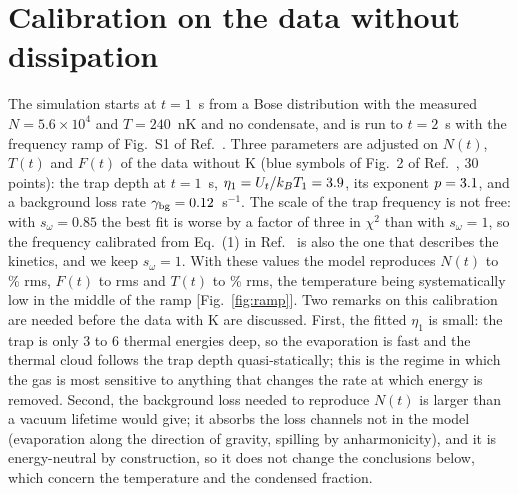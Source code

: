 \section{Calibration on the data without dissipation}
\label{sec:calib}
The simulation starts at $t=1$~s from a Bose distribution with the measured
$N=5.6\times10^4$ and $T=240$~nK and no condensate, and is run to $t=2$~s with
the frequency ramp of Fig.~S1 of Ref.~\cite{MelladoMunoz2020}. Three
parameters are adjusted on $N(t)$, $T(t)$ and $F(t)$ of the data without K
(blue symbols of Fig.~2 of Ref.~\cite{MelladoMunoz2020}, 30 points): the
trap depth at $t=1$~s, $\eta_1=U_t/k_BT_1=3.9$, its exponent $p=3.1$,
and a background loss rate $\gamma_{\rm bg}=0.12$~s$^{-1}$. The scale of the
trap frequency is not free: with $s_\omega=0.85$ the best fit is worse by a
factor of three in $\chi^2$ than with $s_\omega=1$, so the frequency
calibrated from Eq.~(1) in Ref.~\cite{MelladoMunoz2020} is also the one that
describes the kinetics, and we keep $s_\omega=1$. With these values the model
reproduces $N(t)$ to \ndNrms\% rms, $F(t)$ to \ndFrms{} rms and $T(t)$ to
\ndTrms\% rms, the temperature being systematically low in the middle of the
ramp [Fig.~\ref{fig:ramp}]. Two remarks on this calibration are needed before
the data with K are discussed. First, the fitted $\eta_1$ is small: the trap is
only $3$ to $6$ thermal energies deep, so the evaporation is fast and the
thermal cloud follows the trap depth quasi-statically; this is the regime in
which the gas is most sensitive to anything that changes the rate at which
energy is removed. Second, the background loss needed to reproduce $N(t)$ is
larger than a vacuum lifetime would give; it absorbs the loss channels not in
the model (evaporation along the direction of gravity, spilling by
anharmonicity), and it is energy-neutral by construction, so it does not
change the conclusions below, which concern the temperature and the
condensed fraction.

